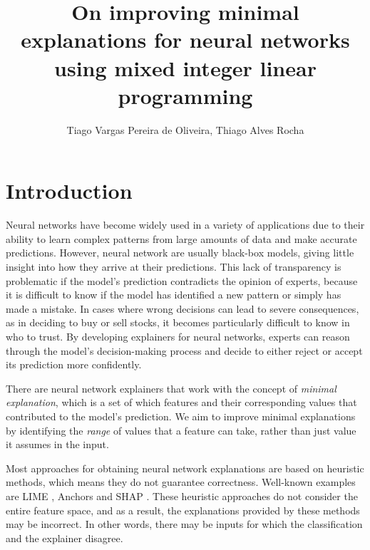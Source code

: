 \documentclass[12pt]{article}
\title{On improving minimal explanations for neural networks using mixed integer linear programming}
\author{Tiago Vargas Pereira de Oliveira\inst{1}, Thiago Alves Rocha\inst{1}}
\begin{document}
\maketitle

\begin{abstract}
\end{abstract}

\section{Introduction}

Neural networks have become widely used in a variety of applications due to their ability to learn complex patterns from large amounts of data and make accurate predictions.
However, neural network are usually black-box models, giving little insight into how they arrive at their predictions.
This lack of transparency is problematic if the model's prediction contradicts the opinion of experts, because it is difficult to know if the model has identified a new pattern or simply has made a mistake.
In cases where wrong decisions can lead to severe consequences, as in deciding to buy or sell stocks, it becomes particularly difficult to know in who to trust.
By developing explainers for neural networks, experts can reason through the model's decision-making process and decide to either reject or accept its prediction more confidently.

There are neural network explainers that work with the concept of \emph{minimal explanation}, which is a set of which features and their corresponding values that contributed to the model's prediction.
We aim to improve minimal explanations by identifying the \emph{range} of values that a feature can take, rather than just value it assumes in the input.


Most approaches for obtaining neural network explanations are based on heuristic methods, which means they do not guarantee correctness.
Well-known examples are LIME \cite{ribeiro2016should}, Anchors \cite{Ribeiro_Singh_Guestrin_2018} and SHAP \cite{lundberg2017unified}.
These heuristic approaches do not consider the entire feature space, and as a result, the explanations provided by these methods may be incorrect. In other words, there may be inputs for which the classification and the explainer disagree.
\end{document}
